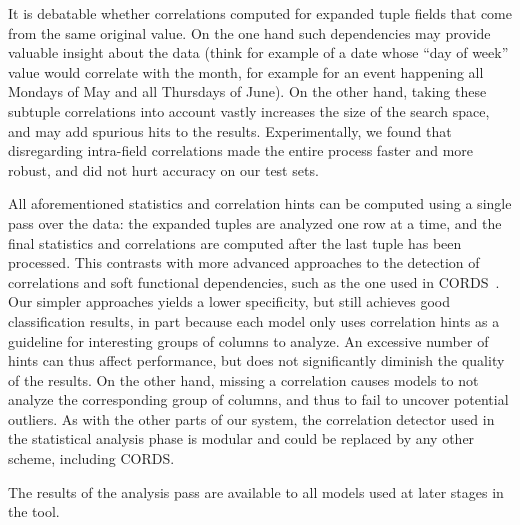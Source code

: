 It is debatable whether correlations computed for expanded tuple fields that come from the same original value. On the one hand such dependencies may provide valuable insight about the data (think for example of a date whose ``day of week'' value would correlate with the month, for example for an event happening all Mondays of May and all Thursdays of June). On the other hand, taking these subtuple correlations into account vastly increases the size of the search space, and may add spurious hits to the results. Experimentally, we found that disregarding intra-field correlations made the entire process faster and more robust, and did not hurt accuracy on our test sets.

All aforementioned statistics and correlation hints can be computed using a single pass over the data: the expanded tuples are analyzed one row at a time, and the final statistics and correlations are computed after the last tuple has been processed. This contrasts with more advanced approaches to the detection of correlations and soft functional dependencies, such as the one used in CORDS~\cite{Ilyas2004}. Our simpler approaches yields a lower specificity, but still achieves good classification results, in part because each model only uses correlation hints as a guideline for interesting groups of columns to analyze. An excessive number of hints can thus affect performance, but does not significantly diminish the quality of the results. On the other hand, missing a correlation causes models to not analyze the corresponding group of columns, and thus to fail to uncover potential outliers. As with the other parts of our system, the correlation detector used in the statistical analysis phase is modular and could be replaced by any other scheme, including CORDS.

The results of the analysis pass are available to all models used at later stages in the tool.
